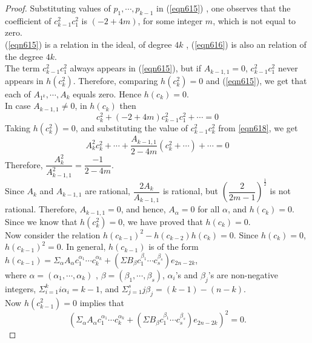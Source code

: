 \documentclass[a4paper,leqno,12pt]{amsart}
\theoremstyle{plain}
\theoremstyle{definition}
\theoremstyle{remark}
\begin{document}
{\begin{proof}
\noindent
Substituting values of $p_{1}, \cdots ,p_{k-1}$ in (\ref{eqn615}) ,  one observes that the coefficient of $c_{k-1}^{2}c_{1}^{2}$ is $(-2+4 m)$,  for some integer $m$,  which is not equal to zero. \\
(\ref{eqn615}) is a relation in the ideal,  of degree $4k$ ,  (\ref{eqn616}) is also an relation of the degree $4k$.\\
The term $c_{k-1}^{2} c_{1}^{2}$ always appears in (\ref{eqn615}),  but if $A_{k-1,1} = 0$,  $c_{k-1}^{2} c_{1}^{2}$ never appears in $h(c_{k}^2)$.  Therefore,  comparing $h(c_{k}^2) =0$ and (\ref{eqn615}),  we get that each of  $A_{1^{k}},  \cdots ,  A_{k}$ equals zero.  
Hence $h(c_{k}) = 0$.  \\
In case $A_{k-1,1} \neq 0$,  in $h(c_{k})$ then 
\begin{equation}
c_{k}^{2} + (-2+4m) c_{k-1}^{2}c_{1}^{2} + \cdots = 0 
\label{eqn618}
\end{equation}
 Taking $h(c_{k}^{2}) = 0$,  and substituting the value of $c_{k-1}^{2}c_{k}^{2}$ from \ref{eqn618},  we get 
 \begin{equation}
 A_{k}^{2}c_{k}^{2} + \cdots + \frac{A_{k-1,1}}{2-4m} (c_{k}^{2} + \cdots ) + \cdots =0
 \end{equation}
Therefore,  $\dfrac{A_{k}^{2}}{A_{k-1,1}^{2}} = \dfrac{-1}{2-4m}$.  \\
Since $A_{k}$ and $A_{k-1,1}$ are rational,  $\dfrac{2A_{k}}{A_{k-1,1}}$ is rational,  but $\left ( \dfrac{2}{2m-1} \right )^{\frac{1}{2}}$ is not rational.  Therefore,  $A_{k-1,1} =0$,  and hence,  $A_{\alpha} =0$ for all $\alpha$,  and $h(c_{k}) =0$.  Since we know that $h(c_{k}^{2})=0$,  we have proved that $h(c_{k}) = 0$.  \\
\noindent
Now consider the relation $h(c_{k-1})^{2} - h(c_{k-2}) h(c_{k}) =0$.  Since $h(c_{k}) = 0$,  $h(c_{k-1})^{2} =0$.   In general,  $h(c_{k-1})$ is of the form 
 $h(c_{k-1}) = \Sigma_{\alpha} A_{\alpha} c_{1}^{\alpha_{1}} \cdots c_{k}^{\alpha_{k}} + (\Sigma B_{\beta} c_{1}^{\beta_{1}} \cdots c_{s}^{\beta_{s}})e_{2n-2k}$,  \\
where $\alpha = (\alpha_{1} ,  \cdots ,  \alpha_{k})$ ,  $\beta = (\beta_{1} ,  \cdots ,  \beta_{s})$, $\alpha_{i}$'s and $\beta_{j}$'s are non-negative integers,   $\Sigma_{i=1}^{k} i \alpha_{i} = k-1$,  and $\Sigma_{j=1}^{s} j \beta_{j} =(k-1) - (n-k)$.  \\
Now $h(c_{k-1}^{2})=0$ implies that 
\begin{equation} 
(\Sigma_{\alpha} A_{\alpha} c_{1}^{\alpha_{1}} \cdots c_{k}^{\alpha_{k}} + (\Sigma B_{\beta} c_{1}^{\beta_{1}} \cdots c_{s}^{\beta_{s}})e_{2n-2k})^{2} =0.

\end{equation}
\end{proof}}
\end{document}
